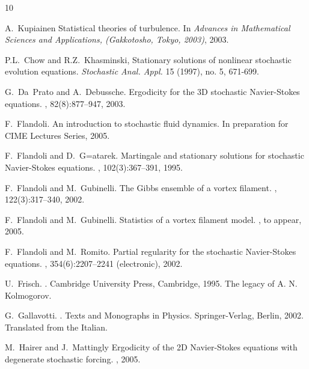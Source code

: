 \documentclass[11pt]{preprint}
\begin{document}
\def\polhk#1{\setbox0=\hbox{#1}{\ooalign{\hidewidth
  \lower1.5ex\hbox{`}\hidewidth\crcr\unhbox0}}}
\begin{thebibliography}{10}

A.\ Kupiainen
\newblock Statistical theories of turbulence.
\newblock In {\em Advances in Mathematical Sciences and Applications,
  (Gakkotosho, Tokyo, 2003)}, 2003.

P.L.~Chow and R.Z.~Khasminski, 
\newblock Stationary solutions of nonlinear stochastic evolution equations.
\newblock \textit{Stochastic Anal. Appl.} 15 (1997), no. 5, 671-699.

G.\ Da~Prato and A.\ Debussche.
\newblock Ergodicity for the 3{D} stochastic {N}avier-{S}tokes equations.
, 82(8):877--947, 2003.

F.~Flandoli.
\newblock An introduction to stochastic fluid
dynamics.
\newblock In preparation for CIME Lectures Series, 2005.

F.\ Flandoli and D.\ G{\polhk{a}}tarek.
\newblock Martingale and stationary solutions for stochastic {N}avier-{S}tokes
  equations.
, 102(3):367--391, 1995.

F.\ Flandoli and M.\ Gubinelli.
\newblock The {G}ibbs ensemble of a vortex filament.
, 122(3):317--340, 2002.

F.\ Flandoli and M.\ Gubinelli.
\newblock Statistics of a vortex filament model.
, to appear, 2005.

F.\ Flandoli and M.\ Romito.
\newblock Partial regularity for the stochastic {N}avier-{S}tokes equations.
, 354(6):2207--2241 (electronic), 2002.

U.\ Frisch.
.
\newblock Cambridge University Press, Cambridge, 1995.
\newblock The legacy of A. N. Kolmogorov.

G.\ Gallavotti.
.
\newblock Texts and Monographs in Physics. Springer-Verlag, Berlin, 2002.
\newblock Translated from the Italian.

M.\ Hairer and J.\ Mattingly
\newblock Ergodicity of the 2D Navier-Stokes equations with degenerate
  stochastic forcing.
, 2005.


\end{thebibliography}
\end{document}
